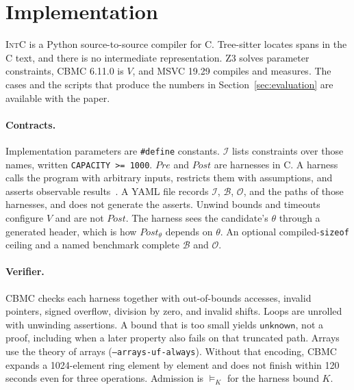 \section{Implementation}
\label{sec:implementation}

\textsc{IntC} is a Python source-to-source compiler for C. Tree-sitter
locates spans in the C text, and there is no intermediate representation.
Z3 solves parameter constraints, CBMC 6.11.0 is \(V\), and MSVC 19.29
compiles and measures. The cases and the scripts that produce the numbers
in Section~\ref{sec:evaluation} are available with the paper.

\paragraph{Contracts.}
Implementation parameters are \texttt{\#define} constants.
\(\mathcal{I}\) lists constraints over those names, written
\texttt{CAPACITY >= 1000}.
\(\mathit{Pre}\) and \(\mathit{Post}\) are harnesses in C. A harness calls
the program with arbitrary inputs, restricts them with assumptions, and
asserts observable results~\cite{clarke2004cbmc}. A YAML file records
\(\mathcal{I}\), \(\mathcal{B}\), \(\mathcal{O}\), and the paths of those
harnesses, and does not generate the asserts. Unwind bounds and timeouts
configure \(V\) and are not \(\mathit{Post}\). The harness sees the
candidate's \(\theta\) through a generated header, which is how
\(\mathit{Post}_\theta\) depends on \(\theta\). An optional
compiled-\texttt{sizeof} ceiling and a named benchmark complete
\(\mathcal{B}\) and \(\mathcal{O}\).

\paragraph{Verifier.}
CBMC checks each harness together with out-of-bounds accesses, invalid
pointers, signed overflow, division by zero, and invalid shifts. Loops are
unrolled with unwinding assertions. A bound that is too small yields
\(\mathsf{unknown}\), not a proof, including when a later property also
fails on that truncated path. Arrays use the theory of arrays
(\texttt{--arrays-uf-always}). Without that encoding, CBMC expands a
1024-element ring element by element and does not finish within 120 seconds
even for three operations. Admission is \(\models_K\) for the harness bound
\(K\).

